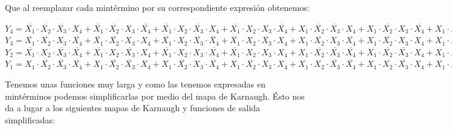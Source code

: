 Que al reemplazar cada mintérmino por su correspondiente expresión obtenemos:
\begin{center}
	$Y_4=\overline{X_1} \cdot \overline{X_2} \cdot \overline{X_3} \cdot X_4 + 
	\overline{X_1} \cdot \overline{X_2} \cdot X_3 \cdot \overline{X_4} + 
	\overline{X_1} \cdot X_2 \cdot \overline{X_3} \cdot X_4 + 
	\overline{X_1} \cdot X_2 \cdot X_3 \cdot \overline{X_4} + 
	X_1 \cdot \overline{X_2} \cdot \overline{X_3} \cdot X_4 +
	X_1 \cdot \overline{X_2} \cdot X_3 \cdot \overline{X_4} + 
	X_1 \cdot X_2 \cdot \overline{X_3} \cdot X_4 + 
	X_1 \cdot X_2 \cdot X_3 \cdot \overline{X_4}$\\
	\smallskip
	$Y_3=\overline{X_1} \cdot \overline{X_2} \cdot X_3 \cdot \overline{X_4} +
	\overline{X_1} \cdot \overline{X_2} \cdot X_3 \cdot X_4 +
	\overline{X_1} \cdot X_2 \cdot \overline{X_3} \cdot \overline{X_4} + 
	\overline{X_1} \cdot X_2 \cdot \overline{X_3} \cdot X_4 + 
	X_1 \cdot \overline{X_2} \cdot X_3 \cdot \overline{X_4} +
	X_1 \cdot \overline{X_2} \cdot X_3 \cdot X_4 + 
	X_1 \cdot X_2 \cdot \overline{X_3} \cdot \overline{X_4} + 
	X_1 \cdot \overline{X_2} \cdot X_3 \cdot X_4$\\
	\smallskip
	$Y_2=\overline{X_1} \cdot X_2 \cdot \overline{X_3} \cdot \overline{X_4} + 
	\overline{X_1} \cdot X_2 \cdot \overline{X_3} \cdot X_4 +
	\overline{X_1} \cdot X_2 \cdot X_3 \cdot \overline{X_4} +
	\overline{X_1} \cdot X_2 \cdot X_3 \cdot X_4 +
	X_1 \cdot \overline{X_2} \cdot \overline{X_3} \cdot \overline{X_4} +
	X_1 \cdot \overline{X_2} \cdot \overline{X_3} \cdot X_4 + 
	X_1 \cdot \overline{X_2} \cdot X_3 \cdot \overline{X_4} + 
	X_1 \cdot \overline{X_2} \cdot X_3 \cdot X_4$\\
	\smallskip
	$Y_1=X_1 \cdot \overline{X_2} \cdot \overline{X_3} \cdot \overline{X_4} +
	X_1 \cdot \overline{X_2} \cdot \overline{X_3} \cdot X_4 + 
	X_1 \cdot \overline{X_2} \cdot X_3 \cdot \overline{X_4} + 
	X_1 \cdot \overline{X_2} \cdot X_3 \cdot X_4 +
	X_1 \cdot X_2 \cdot \overline{X_3} \cdot \overline{X_4} +
	X_1 \cdot X_2 \cdot \overline{X_3} \cdot X_4 +
	X_1 \cdot X_2 \cdot X_3 \cdot \overline{X_4} +
	X_1 \cdot X_2 \cdot X_3 \cdot X_4$\\
\end{center}
Tenemos unas funciones muy larga y como las tenemos expresadas en mintérminos podemos simplificarlas por medio del mapa de Karnaugh. Ésto nos da a lugar a los siguientes mapas de Karnaugh y funciones de salida simplificadas:\\
